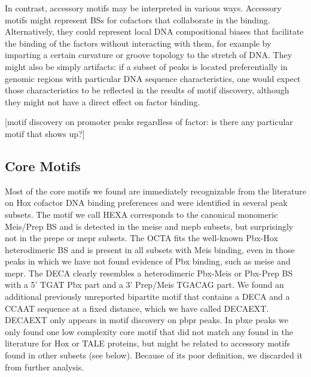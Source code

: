 In contrast, accessory motifs may be interpreted in various ways. Accessory motifs might represent \acp{BS} for cofactors that collaborate in the binding. Alternatively, they could represent local DNA compositional biases that facilitate the binding of the factors without interacting with them, for example by imparting a certain curvature or groove topology to the stretch of DNA. They might also be simply artifacts: if a subset of peaks is located preferentially in genomic regions with particular DNA sequence characteristics, one would expect those characteristics to be reflected in the results of motif discovery, although they might not have a direct effect on factor binding. %

[motif discovery on promoter peaks regardless of factor: is there any particular motif that shows up?]


\subsection{Core Motifs}

Most of the core motifs we found are immediately recognizable from the literature on Hox cofactor DNA binding preferences and were identified in several peak subsets. The motif we call \acf{HEXA} corresponds to the canonical monomeric Meis/Prep \ac{BS} and is detected in the \ac{meise} and \ac{mepb} subsets, but surprisingly not in the \ac{prepe} or \ac{mepr} subsets. The \acf{OCTA} fits the well-known Pbx-Hox heterodimeric \ac{BS} and is present in all subsets with Meis binding, even in those peaks in which we have not found evidence of Pbx binding, such as \ac{meise} and \ac{mepr}. The \acf{DECA} clearly resembles a heterodimeric Pbx-Meis or Pbx-Prep \ac{BS} with a 5' TGAT Pbx part and a 3' Prep/Meis TGACAG part. We found an additional previously unreported bipartite motif that contains a \acs{DECA} and a CCAAT sequence at a fixed distance, which we have called \acf{DECAEXT}. \ac{DECAEXT} only appears in motif discovery on \ac{pbpr} peaks. In \ac{pbxe} peaks we only found one low complexity core motif that did not match any found in the literature for Hox or \ac{TALE} proteins, but might be related to accessory motifs found in other subsets (see below). Because of its poor definition, we discarded it from further analysis. %

